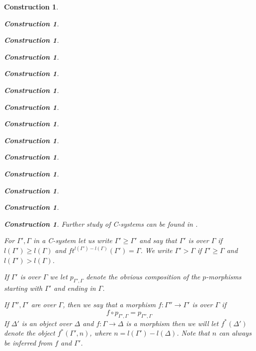 \documentclass[onecolumn,12pt]{amsart}
\numberwithin{proposition}{subsection}
\newtheorem{construction}[proposition]{Construction}
\newcommand{\sr}{\rightarrow}
\begin{document}
\begin{construction}
\begin{construction}
\begin{construction}
\begin{construction}
\begin{construction}
\begin{construction}
\begin{construction}
\begin{construction}
\begin{construction}
\begin{construction}
\begin{construction}
\begin{construction}
\begin{construction}
\begin{construction}
Further study of C-systems can be found in \cite[Sec. 2, pp. 1048-1064]{fromunivwithPiI}. 

For $\Gamma',\Gamma$ in a C-system let us write $\Gamma'\ge \Gamma'$ and say
that $\Gamma'$ is over $\Gamma$ if $l(\Gamma')\ge l(\Gamma)$ and
$ft^{l(\Gamma')-l(\Gamma)}(\Gamma')=\Gamma$. We write $\Gamma'>\Gamma$ if
$\Gamma'\ge \Gamma$ and $l(\Gamma')>l(\Gamma)$.

If $\Gamma'$ is over $\Gamma$ we let $p_{\Gamma',\Gamma}$ denote the
obvious composition of the $p$-morphisms starting with $\Gamma'$ and ending in
$\Gamma$.

If $\Gamma'',\Gamma'$ are over $\Gamma$, then we say that a morphism
$f:\Gamma''\sr \Gamma'$ is over $\Gamma$ if
%
$$f\circ p_{\Gamma',\Gamma}=p_{\Gamma'',\Gamma}$$
%
If $\Delta'$ is an object over $\Delta$ and $f:\Gamma\sr \Delta$ is a morphism
then we will let $f^*(\Delta')$ denote the object $f^*(\Gamma',n)$, where
$n=l(\Gamma')-l(\Delta)$. Note that $n$ can always be inferred from $f$ and
$\Gamma'$.


\end{construction}
\end{construction}
\end{construction}
\end{construction}
\end{construction}
\end{construction}
\end{construction}
\end{construction}
\end{construction}
\end{construction}
\end{construction}
\end{construction}
\end{construction}
\end{construction}
\end{document}
